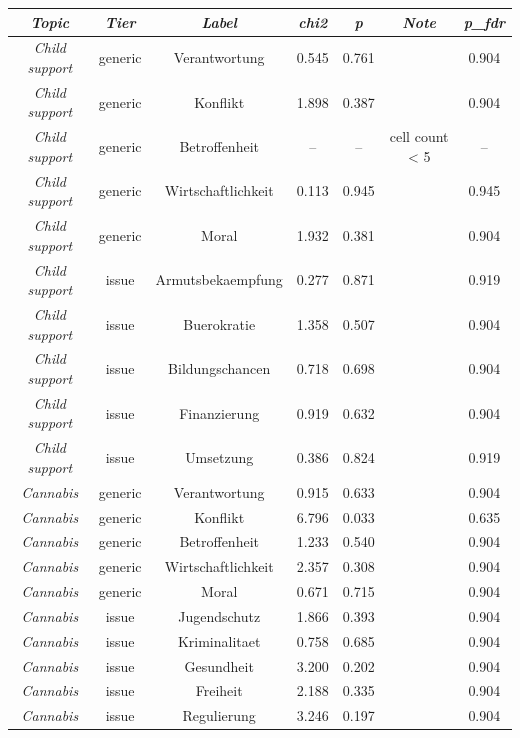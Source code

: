 \begin{tabular}{c c c c c c c}
      \hline
      \textit{Topic} & \textit{Tier} & \textit{Label} & \textit{chi2} & \textit{p} & \textit{Note} & \textit{p\_fdr} \\
      \hline
      \textit{Child support} & generic & Verantwortung & 0.545 & 0.761 &  & 0.904 \\
      \textit{Child support} & generic & Konflikt & 1.898 & 0.387 &  & 0.904 \\
      \textit{Child support} & generic & Betroffenheit & -- & -- & cell count < 5 & -- \\
      \textit{Child support} & generic & Wirtschaftlichkeit & 0.113 & 0.945 &  & 0.945 \\
      \textit{Child support} & generic & Moral & 1.932 & 0.381 &  & 0.904 \\
      \textit{Child support} & issue & Armutsbekaempfung & 0.277 & 0.871 &  & 0.919 \\
      \textit{Child support} & issue & Buerokratie & 1.358 & 0.507 &  & 0.904 \\
      \textit{Child support} & issue & Bildungschancen & 0.718 & 0.698 &  & 0.904 \\
      \textit{Child support} & issue & Finanzierung & 0.919 & 0.632 &  & 0.904 \\
      \textit{Child support} & issue & Umsetzung & 0.386 & 0.824 &  & 0.919 \\
      \textit{Cannabis} & generic & Verantwortung & 0.915 & 0.633 &  & 0.904 \\
      \textit{Cannabis} & generic & Konflikt & 6.796 & 0.033 &  & 0.635 \\
      \textit{Cannabis} & generic & Betroffenheit & 1.233 & 0.540 &  & 0.904 \\
      \textit{Cannabis} & generic & Wirtschaftlichkeit & 2.357 & 0.308 &  & 0.904 \\
      \textit{Cannabis} & generic & Moral & 0.671 & 0.715 &  & 0.904 \\
      \textit{Cannabis} & issue & Jugendschutz & 1.866 & 0.393 &  & 0.904 \\
      \textit{Cannabis} & issue & Kriminalitaet & 0.758 & 0.685 &  & 0.904 \\
      \textit{Cannabis} & issue & Gesundheit & 3.200 & 0.202 &  & 0.904 \\
      \textit{Cannabis} & issue & Freiheit & 2.188 & 0.335 &  & 0.904 \\
      \textit{Cannabis} & issue & Regulierung & 3.246 & 0.197 &  & 0.904 \\
      \hline
    \end{tabular}
